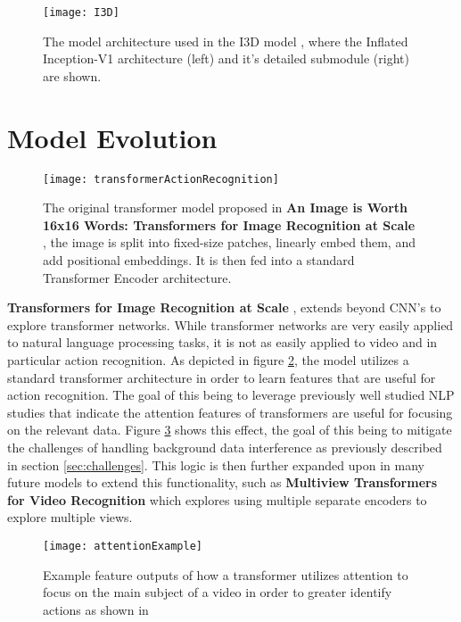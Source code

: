 \begin{figure}[ht]
	\texttt{[image: I3D]}
	\centering
	\caption{The model architecture used in the I3D model \cite{i3d}, where the Inflated Inception-V1 architecture (left) and it's detailed submodule (right) are shown.}
	\label{fig:I3D}
\end{figure}

\section{Model Evolution}

\begin{figure}[ht]
	\texttt{[image: transformerActionRecognition]}
	\centering
	\caption{The original transformer model proposed in \textbf{An Image is Worth 16x16 Words: Transformers for Image Recognition at Scale} \cite{transformer_og}, the image is split into fixed-size patches, linearly embed them, and add positional embeddings. It is then fed into a standard Transformer Encoder architecture.}
	\label{fig:transformerActionRecognition}
\end{figure}

\textbf{Transformers for Image Recognition at Scale} \cite{transformer_og}, extends beyond CNN's to explore transformer networks. While transformer networks are very easily applied to natural language processing tasks, it is not as easily applied to video and in particular action recognition. As depicted in figure \ref{fig:transformerActionRecognition}, the model utilizes a standard transformer architecture in order to learn features that are useful for action recognition. The goal of this being to leverage previously well studied NLP studies that indicate the attention features of transformers are useful for focusing on the relevant data. Figure \ref{fig:attentionExample} shows this effect, the goal of this being to mitigate the challenges of handling background data interference as previously described in section \ref{sec:challenges}. This logic is then further expanded upon in many future models to extend this functionality, such as \textbf{Multiview Transformers for Video Recognition} \cite{multiview_transformers} which explores using multiple separate encoders to explore multiple views.

\begin{figure}[ht]
	\texttt{[image: attentionExample]}
	\centering
	\caption{Example feature outputs of how a transformer utilizes attention to focus on the main subject of a video in order to greater identify actions as shown in \cite{transformer_og}}
	\label{fig:attentionExample}
\end{figure}


